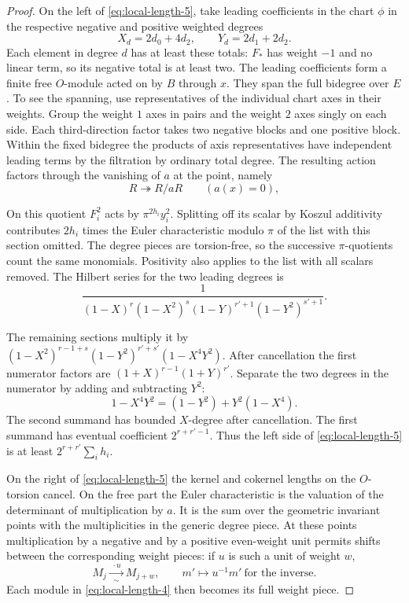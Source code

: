 \begin{proof}
On the left of \eqref{eq:local-length-5}, take leading coefficients in the chart \(\phi\) in the respective negative and positive weighted degrees
\[
 X_d=2d_0+4d_2,\qquad Y_d=2d_1+2d_2 .
\]
Each element in degree \(d\) has at least these totals:
\(F_*\) has weight \(-1\) and no linear term, so its
negative total is at least two. The leading coefficients
form a finite free \(O\)-module acted on by \(B\)
through \(x\). They span the full bidegree over \(E\).
To see the spanning, use representatives of the
individual chart axes in their weights. Group the
weight \(1\) axes in pairs and the weight \(2\) axes
singly on each side. Each third-direction factor takes
two negative blocks and one positive block. Within the
fixed bidegree the products of axis representatives
have independent leading terms by the filtration by
ordinary total degree. The resulting action factors through the vanishing of \(a\) at the point, namely
\[
 R\twoheadrightarrow R/aR\qquad(a(x)=0),
\]

On this quotient \(F_i^2\) acts by \(\pi^{2h_i} y_i^2\).
Splitting off its scalar by Koszul additivity contributes
\(2h_i\) times the Euler characteristic modulo \(\pi\)
of the list with this section omitted. The degree
pieces are torsion-free, so the successive
\(\pi\)-quotients count the same monomials. Positivity
also applies to the list with all scalars removed.
The Hilbert series for the two leading degrees is
\[
 \frac{1}{(1-X)^r(1-X^2)^s(1-Y)^{r'+1}(1-Y^2)^{s'+1}}.
\]

The remaining sections multiply it by
\((1-X^2)^{r-1+s}(1-Y^2)^{r'+s'}(1-X^4Y^2)\).
After cancellation the first numerator factors are
\((1+X)^{r-1}(1+Y)^{r'}\). Separate the two degrees in the numerator by adding and subtracting \(Y^2\):
\[
 1-X^4Y^2=(1-Y^2)+Y^2(1-X^4).
\]
The second summand has bounded \(X\)-degree after
cancellation. The first summand has eventual coefficient
\(2^{r+r'-1}\). Thus the left side of \eqref{eq:local-length-5} is at least
\(2^{r+r'}\sum_i h_i\).

On the right of \eqref{eq:local-length-5} the kernel and cokernel lengths on
the \(O\)-torsion cancel. On the free part the Euler
characteristic is the valuation of the determinant of
multiplication by \(a\). It is the sum over the geometric
invariant points with the multiplicities in the generic
degree piece. At these points multiplication by a negative and by a positive even-weight unit permits shifts between the corresponding weight pieces: if \(u\) is such a unit of weight \(w\),
\[
 M_j\xrightarrow[\sim]{\ \cdot u\ } M_{j+w},\qquad m'\longmapsto u^{-1}m'\ \text{for the inverse}.
\] Each module in \eqref{eq:local-length-4}
then becomes its full weight piece.


\end{proof}
